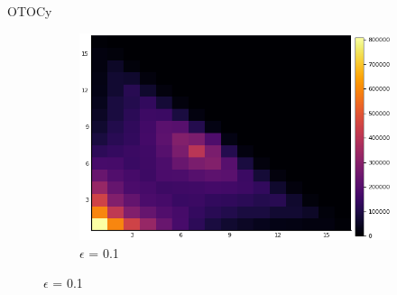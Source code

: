 \documentclass{article}
\begin{document}
\begin{section}{OTOCy}
\begin{figure}[H]
\begin{subfigure}{.33\textwidth}
                                        \centering
                                        \includegraphics[width=1.0\linewidth]{nW0.1.png}
                                      \caption{$\epsilon$ = 0.1}
                                    \end{subfigure}%


\end{figure}
\end{section}
\end{document}
